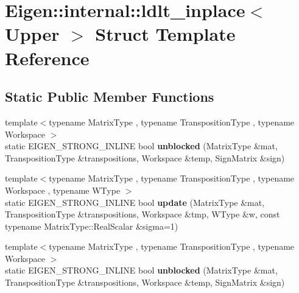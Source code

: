 \hypertarget{struct_eigen_1_1internal_1_1ldlt__inplace_3_01_upper_01_4}{}\section{Eigen\+:\+:internal\+:\+:ldlt\+\_\+inplace$<$ Upper $>$ Struct Template Reference}
\label{struct_eigen_1_1internal_1_1ldlt__inplace_3_01_upper_01_4}
\subsection*{Static Public Member Functions}
\begin{DoxyCompactItemize}
\item 
\mbox{\label{struct_eigen_1_1internal_1_1ldlt__inplace_3_01_upper_01_4_ae90ef00f0486fd2d84f8fd3b7b1fe3e3}} 
{\footnotesize template$<$typename Matrix\+Type , typename Transposition\+Type , typename Workspace $>$ }\\static E\+I\+G\+E\+N\+\_\+\+S\+T\+R\+O\+N\+G\+\_\+\+I\+N\+L\+I\+NE bool {\bfseries unblocked} (Matrix\+Type \&mat, Transposition\+Type \&transpositions, Workspace \&temp, Sign\+Matrix \&sign)
\item 
\mbox{\label{struct_eigen_1_1internal_1_1ldlt__inplace_3_01_upper_01_4_ac476b25dfc49b62b8351201cb06a7708}} 
{\footnotesize template$<$typename Matrix\+Type , typename Transposition\+Type , typename Workspace , typename W\+Type $>$ }\\static E\+I\+G\+E\+N\+\_\+\+S\+T\+R\+O\+N\+G\+\_\+\+I\+N\+L\+I\+NE bool {\bfseries update} (Matrix\+Type \&mat, Transposition\+Type \&transpositions, Workspace \&tmp, W\+Type \&w, const typename Matrix\+Type\+::\+Real\+Scalar \&sigma=1)
\item 
\mbox{\label{struct_eigen_1_1internal_1_1ldlt__inplace_3_01_upper_01_4_ae90ef00f0486fd2d84f8fd3b7b1fe3e3}} 
{\footnotesize template$<$typename Matrix\+Type , typename Transposition\+Type , typename Workspace $>$ }\\static E\+I\+G\+E\+N\+\_\+\+S\+T\+R\+O\+N\+G\+\_\+\+I\+N\+L\+I\+NE bool {\bfseries unblocked} (Matrix\+Type \&mat, Transposition\+Type \&transpositions, Workspace \&temp, Sign\+Matrix \&sign)

\end{DoxyCompactItemize}
